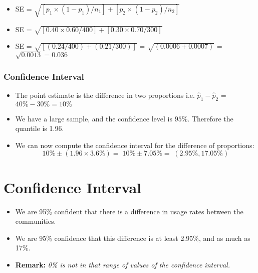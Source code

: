 \documentclass[a4paper,12pt]{article}
\begin{document}


\begin{itemize}
\item SE = $\sqrt{ [p_1 \times (1 - p_1) / n_1] + [p_2 \times (1 - p_2) / n_2] } $
\item SE = $\sqrt{ [0.40 \times 0.60 / 400] + [0.30 \times 0.70 / 300] } $
\item SE  = $\sqrt{[ (0.24 / 400) + (0.21 / 300) ]}$ = $\sqrt{(0.0006 + 0.0007)}$ = $\sqrt{0.0013} = 0.036$
\end{itemize}




\subsubsection{Confidence Interval}
\begin{itemize}
\item The point estimate is the difference in two proportions i.e. $\hat{p}_1 - \hat{p}_2$ = $40 \% - 30 \% = 10 \%$
\item We have a large sample, and the confidence level is $95\%$. Therefore the quantile is 1.96.
\item We can now compute the confidence interval for the difference of proportions:
\[ 10\% \pm (1.96 \times 3.6 \%)  =\; 10\% \pm 7.05 \% = \;(2.95\%, 17.05\%) \]

\end{itemize}









\section{Confidence Interval}
\begin{itemize}


\item We are 95\% confident that there is a difference in usage rates between the communities.\medskip \item We are 95\% confidence that this difference is at least 2.95\%, and as much as 17\%.
\item \textbf{Remark: }\textit{ 0\% is not in that range of values of the confidence interval.}
\end{itemize}
\end{document}
